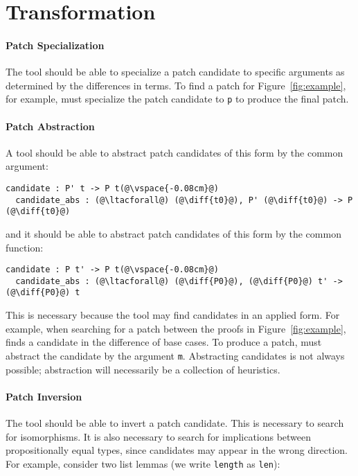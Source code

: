 \section{Transformation}
\label{sec:pumpkin-trans}


\paragraph{Patch Specialization} The tool should be able to specialize a patch candidate to specific arguments as determined by
the differences in terms. To find a patch for Figure~\ref{fig:example}, for example, \sysname
must specialize the patch candidate to \lstinline{p} to produce the final patch.

\paragraph{Patch Abstraction} A tool should be able to abstract patch candidates of this form by the common argument:

\begin{lstlisting}[language=coq]
  candidate : P' t -> P t(@\vspace{-0.08cm}@)
  candidate_abs : (@\ltacforall@) (@\diff{t0}@), P' (@\diff{t0}@) -> P (@\diff{t0}@)
\end{lstlisting}
and it should be able to abstract patch candidates of this form by the common function:

\begin{lstlisting}[language=coq]
  candidate : P t' -> P t(@\vspace{-0.08cm}@)
  candidate_abs : (@\ltacforall@) (@\diff{P0}@), (@\diff{P0}@) t' -> (@\diff{P0}@) t
\end{lstlisting} 

This is necessary because the tool may find candidates in an applied form.
For example, when searching for a patch between the proofs in Figure~\ref{fig:example},
\sysname finds a candidate in the difference of base cases. To produce a patch, 
\sysname must abstract the candidate by the argument \lstinline{m}.
Abstracting candidates is not always possible; abstraction will necessarily be a collection of heuristics.

\paragraph{Patch Inversion} The tool should be able to invert a patch candidate.
This is necessary to search for isomorphisms.
It is also necessary to search for implications between propositionally
equal types, since candidates may appear in the wrong direction.
For example, consider two list lemmas (we write \lstinline{length} as \lstinline{len}):


